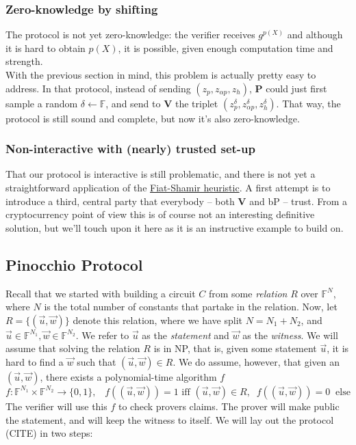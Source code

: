 \documentclass[11pt,oneside]{article}
\newcommand{\be}{\begin{equation}}
\newcommand{\ee}{\end{equation}}
\newcommand{\bP}{\textbf{P} }
\newcommand{\bV}{\textbf{V} }
\theoremstyle{definition}
\theoremstyle{remark}
\numberwithin{equation}{section}
\begin{document}
\subsubsection{Zero-knowledge by shifting}

The protocol is not yet zero-knowledge: the verifier receives $g^{p(X)}$ and although it is hard to obtain $p(X)$, it is possible, given enough computation time and strength.\\
With the previous section in mind, this problem is actually pretty easy to address. In that protocol, instead of sending $(z_p,z_{\alpha p},z_h)$, \bP could just first sample a random $\delta\leftarrow\mathbb{F}$, and send to \bV the triplet $(z_p^\delta,z_{\alpha p}^\delta,z_h^\delta)$. That way, the protocol is still sound and complete, but now it's also zero-knowledge. 

\subsubsection{Non-interactive with (nearly) trusted set-up}

That our protocol is interactive is still problematic, and there is not yet a straightforward application of the \hyperlink{box:schnorr}{Fiat-Shamir heuristic}. A first attempt is to introduce a third, central party that everybody -- both \bV and bP -- trust. From a cryptocurrency point of view this is of course not an interesting definitive solution, but we'll touch upon it here as it is an instructive example to build on.\\


\subsection{Pinocchio Protocol}
Recall that we started with building a circuit $C$ from some \emph{relation} $R$ over $\mathbb{F}^N$, where $N$ is the total number of constants that partake in the relation. Now, let $R=\{(\vec{u},\vec{w})\}$ denote this relation, where we have split $N=N_1+N_2$, and $\vec{u}\in\mathbb{F}^{N_1},\vec{w}\in\mathbb{F}^{N_2}$. We refer to $\vec{u}$ as the \emph{statement} and $\vec{w}$ as the \emph{witness}. We will assume that solving the relation $R$ is in NP, that is, given some statement $\vec{u}$, it is hard to find a $\vec{w}$ such that $(\vec{u},\vec{w})\in R$. We do assume, however, that given an $(\vec{u},\vec{w})$, there exists a polynomial-time algorithm $f$
\be
f:\mathbb{F}^{N_1}\times\mathbb{F}^{N_2}\rightarrow\{0,1\},\;\;\;f((\vec{u},\vec{w}))=1\text{ iff }(\vec{u},\vec{w})\in R,\;\;f((\vec{u},\vec{w}))=0\;\;\text{else}
\ee
The verifier will use this $f$ to check provers claims. The prover will make public the statement, and will keep the witness to itself. We will lay out the protocol (CITE) in two steps:
\end{document}
